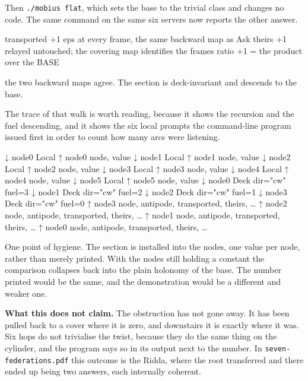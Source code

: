 \documentclass[11pt,a4paper]{article}
\begin{document}
Then \verb|./mobius flat|, which sets the base to the trivial class and changes no
code. The same command on the same six servers now reports the other answer.

\begin{term}
    transported   +1   eps at every frame, the same backward map as Ask
    theirs        +1   relayed untouched; the covering map identifies the frames
    ratio         +1   = the product over the BASE

    the two backward maps agree. The section is deck-invariant and
    descends to the base.
\end{term}

The trace of that walk is worth reading, because it shows the recursion and the fuel
descending, and it shows the six local prompts the command-line program issued first
in order to count how many arcs were listening.

\begin{term}
↓ node0     Local
↑ node0     {node, value}
↓ node1     Local
↑ node1     {node, value}
↓ node2     Local
↑ node2     {node, value}
↓ node3     Local
↑ node3     {node, value}
↓ node4     Local
↑ node4     {node, value}
↓ node5     Local
↑ node5     {node, value}
↓ node0     Deck dir="cw" fuel=3
  ↓ node1     Deck dir="cw" fuel=2
    ↓ node2     Deck dir="cw" fuel=1
      ↓ node3     Deck dir="cw" fuel=0
      ↑ node3     {node, antipode, transported, theirs, …}
    ↑ node2     {node, antipode, transported, theirs, …}
  ↑ node1     {node, antipode, transported, theirs, …}
↑ node0     {node, antipode, transported, theirs, …}
\end{term}

One point of hygiene. The section is installed into the nodes, one value per node,
rather than merely printed. With the nodes still holding a constant the comparison
collapses back into the plain holonomy of the base. The number printed would be the
same, and the demonstration would be a different and weaker one.

\begin{alarmbox}
\textbf{What this does not claim.} The obstruction has not gone away. It has been
pulled back to a cover where it is zero, and downstairs it is exactly where it was.
Six hops do not trivialise the twist, because they do the same thing on the cylinder,
and the program says so in its output next to the number. In
\texttt{seven-federations.pdf} this outcome is the Ridda, where the root transferred
and there ended up being two answers, each internally coherent.
\end{alarmbox}
\end{document}
